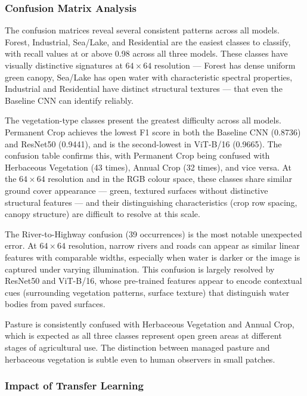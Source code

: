 \documentclass[12pt, letterpaper]{article}
\begin{document}
\subsubsection{Confusion Matrix Analysis}

The confusion matrices reveal several consistent patterns across all models. Forest,
Industrial, Sea/Lake, and Residential are the easiest classes to classify, with
recall values at or above 0.98 across all three models. These classes have visually
distinctive signatures at $64 \times 64$ resolution --- Forest has dense uniform
green canopy, Sea/Lake has open water with characteristic spectral properties,
Industrial and Residential have distinct structural textures --- that even the
Baseline CNN can identify reliably.

The vegetation-type classes present the greatest difficulty across all models.
Permanent Crop achieves the lowest F1 score in both the Baseline CNN (0.8736) and
ResNet50 (0.9441), and is the second-lowest in ViT-B/16 (0.9665). The confusion
table confirms this, with Permanent Crop being confused with Herbaceous Vegetation
(43 times), Annual Crop (32 times), and vice versa. At the $64 \times 64$ resolution
and in the RGB colour space, these classes share similar ground cover appearance ---
green, textured surfaces without distinctive structural features --- and their
distinguishing characteristics (crop row spacing, canopy structure) are difficult to
resolve at this scale.

The River-to-Highway confusion (39 occurrences) is the most notable unexpected error.
At $64 \times 64$ resolution, narrow rivers and roads can appear as similar linear
features with comparable widths, especially when water is darker or the image is
captured under varying illumination. This confusion is largely resolved by
ResNet50 and ViT-B/16, whose pre-trained features appear to encode contextual cues
(surrounding vegetation patterns, surface texture) that distinguish water bodies
from paved surfaces.

Pasture is consistently confused with Herbaceous Vegetation and Annual Crop, which
is expected as all three classes represent open green areas at different stages of
agricultural use. The distinction between managed pasture and herbaceous vegetation
is subtle even to human observers in small patches.

\subsubsection{Impact of Transfer Learning}
\end{document}
